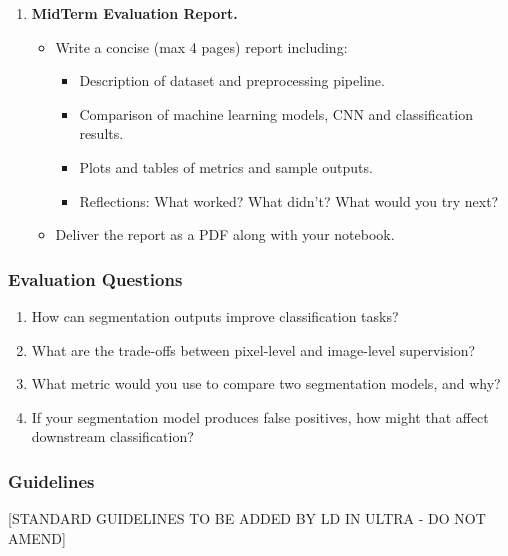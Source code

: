 \begin{enumerate}
  \item \textbf{MidTerm Evaluation Report.}
    \begin{itemize}
      \item Write a concise (max 4 pages) report including:
        \begin{itemize}
          \item Description of dataset and preprocessing pipeline.
          \item Comparison of machine learning models, CNN and classification results.
          \item Plots and tables of metrics and sample outputs.
          \item Reflections: What worked? What didn’t? What would you try next?
        \end{itemize}
      \item Deliver the report as a PDF along with your notebook.
    \end{itemize}
\end{enumerate}

\subsubsection*{Evaluation Questions}
\begin{enumerate}
  \item How can segmentation outputs improve classification tasks?
  \item What are the trade-offs between pixel-level and image-level supervision?
  \item What metric would you use to compare two segmentation models, and why?
  \item If your segmentation model produces false positives, how might that affect downstream classification?
\end{enumerate}

\subsubsection*{Guidelines}
[STANDARD GUIDELINES TO BE ADDED BY LD IN ULTRA - DO NOT AMEND]
